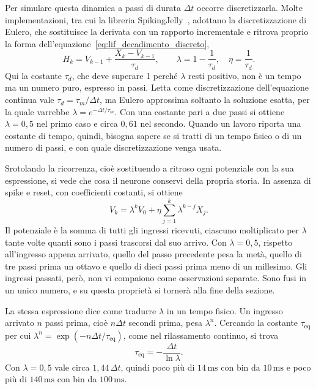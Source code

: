 Per simulare questa dinamica a passi di durata $\Delta t$ occorre discretizzarla. Molte implementazioni, tra cui la libreria SpikingJelly~\cite{fang2023spikingjelly}, adottano la discretizzazione di Eulero, che sostituisce la derivata con un rapporto incrementale e ritrova proprio la forma dell'equazione~\eqref{eq:lif_decadimento_discreto},
\begin{equation}
\label{eq:lif_euler_discreto}
H_k=V_{k-1}+\frac{X_k-V_{k-1}}{\tau_d},
\qquad
\lambda=1-\frac1{\tau_d},\quad
\eta=\frac1{\tau_d}.
\end{equation}
Qui la costante $\tau_d$, che deve superare 1 perché $\lambda$ resti positivo, non è un tempo ma un numero puro, espresso in passi. Letta come discretizzazione dell'equazione continua vale $\tau_d=\tau_m/\Delta t$, ma Eulero approssima soltanto la soluzione esatta, per la quale varrebbe $\lambda=e^{-\Delta t/\tau_m}$. Con una costante pari a due passi si ottiene $\lambda=0{,}5$ nel primo caso e circa $0{,}61$ nel secondo. Quando un lavoro riporta una costante di tempo, quindi, bisogna sapere se si tratti di un tempo fisico o di un numero di passi, e con quale discretizzazione venga usata.

Srotolando la ricorrenza, cioè sostituendo a ritroso ogni potenziale con la sua espressione, si vede che cosa il neurone conservi della propria storia. In assenza di spike e reset, con coefficienti costanti, si ottiene
\begin{equation}
\label{eq:lif_espansione_temporale}
V_k=\lambda^k V_0+
\eta\sum_{j=1}^{k}\lambda^{k-j}X_j.
\end{equation}
Il potenziale è la somma di tutti gli ingressi ricevuti, ciascuno moltiplicato per $\lambda$ tante volte quanti sono i passi trascorsi dal suo arrivo. Con $\lambda=0{,}5$, rispetto all'ingresso appena arrivato, quello del passo precedente pesa la metà, quello di tre passi prima un ottavo e quello di dieci passi prima meno di un millesimo. Gli ingressi passati, però, non vi compaiono come osservazioni separate. Sono fusi in un unico numero, e su questa proprietà si tornerà alla fine della sezione.

La stessa espressione dice come tradurre $\lambda$ in un tempo fisico. Un ingresso arrivato $n$ passi prima, cioè $n\Delta t$ secondi prima, pesa $\lambda^n$. Cercando la costante $\tau_{\mathrm{eq}}$ per cui $\lambda^n=\exp(-n\Delta t/\tau_{\mathrm{eq}})$, come nel rilassamento continuo, si trova
\begin{equation}
\label{eq:tau_fisica_equivalente}
\tau_{\mathrm{eq}}=-\frac{\Delta t}{\ln\lambda}.
\end{equation}
Con $\lambda=0{,}5$ vale circa $1{,}44\,\Delta t$, quindi poco più di $14\,\mathrm{ms}$ con bin da $10\,\mathrm{ms}$ e poco più di $140\,\mathrm{ms}$ con bin da $100\,\mathrm{ms}$.

